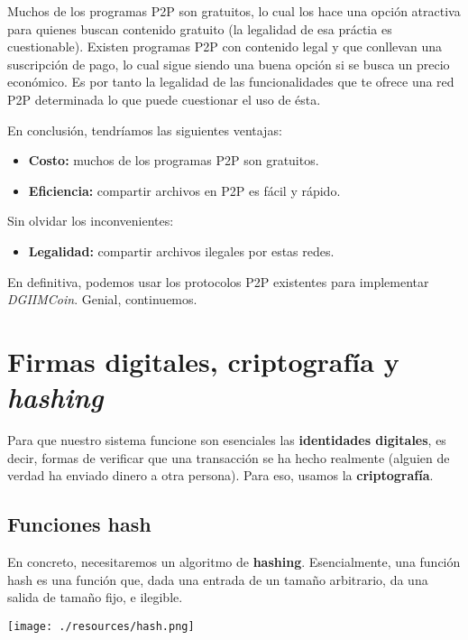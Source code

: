 \documentclass[10pt, a4paper]{article}
\theoremstyle{theorem-style}
\theoremstyle{theorem-style}
\theoremstyle{definition-style}
\theoremstyle{remark-style}
\theoremstyle{example-style}
\theoremstyle{definition-style}
\theoremstyle{remark-style}
\begin{document}
Muchos de los programas P2P son gratuitos, lo cual los hace una opción atractiva para quienes buscan contenido gratuito (la legalidad de esa práctia es cuestionable). Existen programas P2P con contenido legal y que conllevan una suscripción  de pago, lo cual sigue siendo una buena opción si se busca un precio económico. Es por tanto la legalidad de las funcionalidades que te ofrece una red P2P determinada lo que puede cuestionar el uso de ésta.

En conclusión, tendríamos las siguientes ventajas:
\begin{itemize}
\def\labelenumi{\arabic{enumi}.}
\itemsep1pt\parskip0pt
\item
  \textbf{Costo:} muchos de los programas P2P son gratuitos.
\item
  \textbf{Eficiencia:} compartir archivos en P2P es fácil y rápido.
\end{itemize}

Sin olvidar los inconvenientes:
\begin{itemize}
\def\labelenumi{\arabic{enumi}.}
\itemsep1pt\parskip0pt
\item
  \textbf{Legalidad:} compartir archivos ilegales por estas redes.
\end{itemize}

En definitiva, podemos usar los protocolos P2P existentes para
implementar \emph{DGIIMCoin}. Genial, continuemos.
\section{Firmas digitales, criptografía y
\emph{hashing}}\label{firmas-digitales-criptografuxeda-y-hashing}

Para que nuestro sistema funcione son esenciales las \textbf{identidades
digitales}, es decir, formas de verificar que una transacción se ha
hecho realmente (alguien de verdad ha enviado dinero a otra persona).
Para eso, usamos la \textbf{criptografía}.

\subsection{Funciones hash}

En concreto, necesitaremos un algoritmo de \textbf{hashing}. Esencialmente, una función hash es una función que, dada una entrada de un tamaño arbitrario, da una salida de tamaño fijo, e ilegible.

\begin{center}
	\texttt{[image: ./resources/hash.png]}
\end{center}
\end{document}
